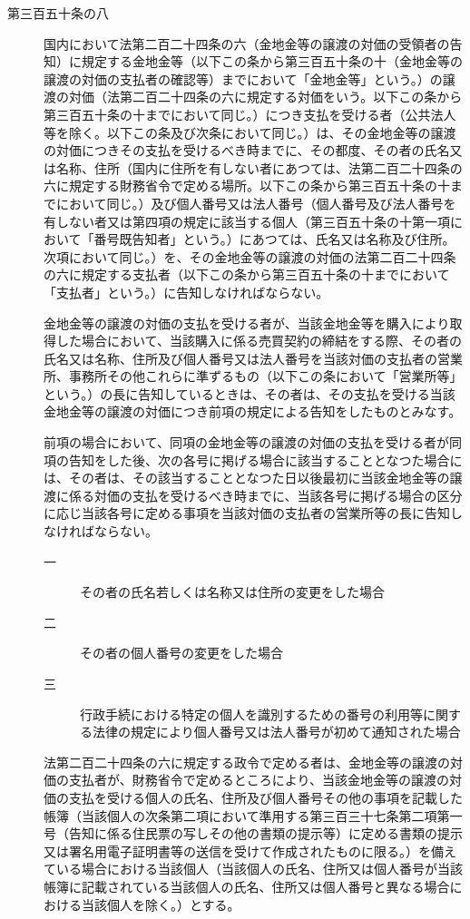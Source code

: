 \documentclass[twocolumn,a4j,10pt]{ltjtarticle}
\begin{document}
\begin{description}
\item[第三百五十条の八]国内において法第二百二十四条の六（金地金等の譲渡の対価の受領者の告知）に規定する金地金等（以下この条から第三百五十条の十（金地金等の譲渡の対価の支払者の確認等）までにおいて「金地金等」という。）の譲渡の対価（法第二百二十四条の六に規定する対価をいう。以下この条から第三百五十条の十までにおいて同じ。）につき支払を受ける者（公共法人等を除く。以下この条及び次条において同じ。）は、その金地金等の譲渡の対価につきその支払を受けるべき時までに、その都度、その者の氏名又は名称、住所（国内に住所を有しない者にあつては、法第二百二十四条の六に規定する財務省令で定める場所。以下この条から第三百五十条の十までにおいて同じ。）及び個人番号又は法人番号（個人番号及び法人番号を有しない者又は第四項の規定に該当する個人（第三百五十条の十第一項において「番号既告知者」という。）にあつては、氏名又は名称及び住所。次項において同じ。）を、その金地金等の譲渡の対価の法第二百二十四条の六に規定する支払者（以下この条から第三百五十条の十までにおいて「支払者」という。）に告知しなければならない。
\item[]金地金等の譲渡の対価の支払を受ける者が、当該金地金等を購入により取得した場合において、当該購入に係る売買契約の締結をする際、その者の氏名又は名称、住所及び個人番号又は法人番号を当該対価の支払者の営業所、事務所その他これらに準ずるもの（以下この条において「営業所等」という。）の長に告知しているときは、その者は、その支払を受ける当該金地金等の譲渡の対価につき前項の規定による告知をしたものとみなす。
\item[]前項の場合において、同項の金地金等の譲渡の対価の支払を受ける者が同項の告知をした後、次の各号に掲げる場合に該当することとなつた場合には、その者は、その該当することとなつた日以後最初に当該金地金等の譲渡に係る対価の支払を受けるべき時までに、当該各号に掲げる場合の区分に応じ当該各号に定める事項を当該対価の支払者の営業所等の長に告知しなければならない。
\begin{description}
\item[一]その者の氏名若しくは名称又は住所の変更をした場合
\item[二]その者の個人番号の変更をした場合
\item[三]行政手続における特定の個人を識別するための番号の利用等に関する法律の規定により個人番号又は法人番号が初めて通知された場合
\end{description}
\item[]法第二百二十四条の六に規定する政令で定める者は、金地金等の譲渡の対価の支払者が、財務省令で定めるところにより、当該金地金等の譲渡の対価の支払を受ける個人の氏名、住所及び個人番号その他の事項を記載した帳簿（当該個人の次条第二項において準用する第三百三十七条第二項第一号（告知に係る住民票の写しその他の書類の提示等）に定める書類の提示又は署名用電子証明書等の送信を受けて作成されたものに限る。）を備えている場合における当該個人（当該個人の氏名、住所又は個人番号が当該帳簿に記載されている当該個人の氏名、住所又は個人番号と異なる場合における当該個人を除く。）とする。
\end{description}
\end{document}
